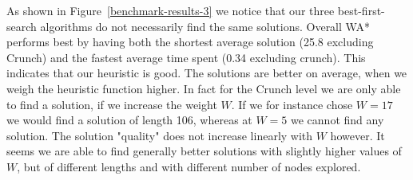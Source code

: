 \documentclass[12pt]{article}
\begin{document}
As shown in Figure~\ref{benchmark-results-3} we notice that our three best-first-search algorithms do not necessarily find the same solutions.
Overall WA* performs best by having both the shortest average solution (25.8 excluding Crunch) and the fastest average time spent (0.34 excluding crunch).
This indicates that our heuristic is good. The solutions are better on average, when we weigh the heuristic function higher. In fact for the Crunch level we are only able to find a solution, if we increase the weight $W$. If we for instance chose $W=17$ we would find a solution of length 106, whereas at $W=5$ we cannot find any solution. The solution "quality" does not increase linearly with $W$ however. It seems we are able to find generally better solutions with slightly higher values of $W$, but of different lengths and with different number of nodes explored.
\end{document}
